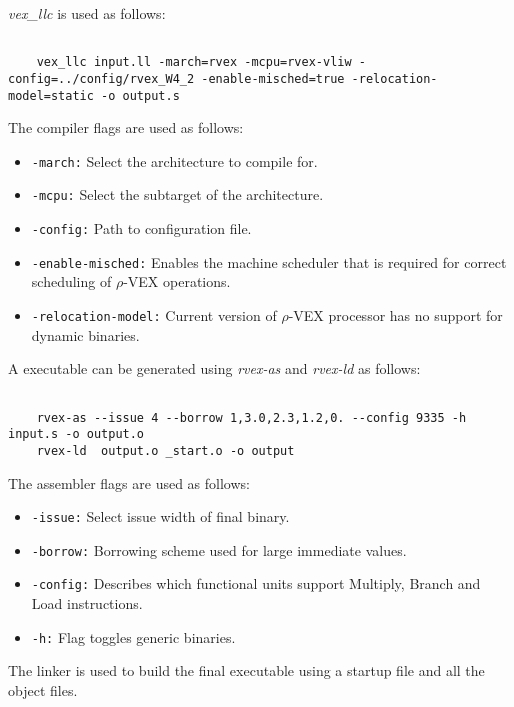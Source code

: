 \emph{vex\_llc} is used as follows:

\begin{lstlisting}

	vex_llc input.ll -march=rvex -mcpu=rvex-vliw -config=../config/rvex_W4_2 -enable-misched=true -relocation-model=static -o output.s

\end{lstlisting}

The compiler flags are used as follows:

\begin{itemize}
	\item \texttt{-march:} Select the architecture to compile for.
	\item \texttt{-mcpu:} Select the subtarget of the architecture.
	\item \texttt{-config:} Path to configuration file.
	\item \texttt{-enable-misched:} Enables the machine scheduler that is required for correct scheduling of $\rho$-VEX operations.
	\item \texttt{-relocation-model:} Current version of $\rho$-VEX processor has no support for dynamic binaries.
\end{itemize}

A executable can be generated using \emph{rvex-as} and \emph{rvex-ld} as follows:

\begin{lstlisting}

	rvex-as --issue 4 --borrow 1,3.0,2.3,1.2,0. --config 9335 -h input.s -o output.o
	rvex-ld  output.o _start.o -o output

\end{lstlisting}

The assembler flags are used as follows:

\begin{itemize}
	\item \texttt{-issue:} Select issue width of final binary.
	\item \texttt{-borrow:} Borrowing scheme used for large immediate values.
	\item \texttt{-config:} Describes which functional units support Multiply, Branch and Load instructions.
	\item \texttt{-h:} Flag toggles generic binaries.
\end{itemize}

The linker is used to build the final executable using a startup file and all the object files.


